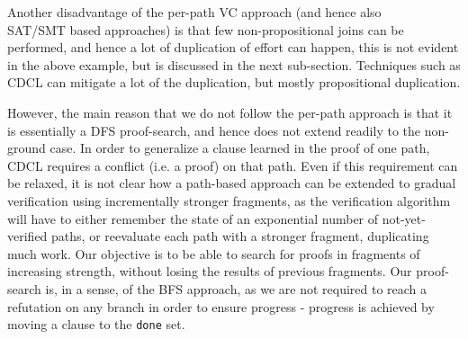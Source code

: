 Another disadvantage of the per-path VC approach (and hence also \\SAT/SMT based approaches) is that few non-propositional joins can be performed, and hence a lot of duplication of effort can happen, this is not evident in the above example, but is discussed in the next sub-section. Techniques such as CDCL can mitigate a lot of the duplication, but mostly propositional duplication.

However, the main reason that we do not follow the per-path approach is that it is essentially a DFS proof-search, 
and hence does not extend readily to the non-ground case. In order to generalize a clause learned in the proof of one path, 
CDCL requires a conflict (i.e. a proof) on that path. 
Even if this requirement can be relaxed, it is not clear how a path-based approach can be extended to gradual verification using incrementally stronger fragments, as the verification algorithm will have to either remember the state of an exponential number of not-yet-verified paths, or reevaluate each path with a stronger fragment, duplicating much work. 
Our objective is to be able to search for proofs in fragments of increasing strength, without losing the results of previous fragments. Our proof-search is, in a sense, of the BFS approach, as we are not required to reach a refutation on any branch in order to ensure progress - progress is achieved by moving a clause to the \lstinline|done| set.

